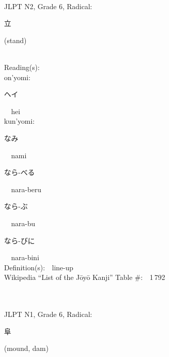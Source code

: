 \begin{multicols}{2}
{\fontsize{34pt}{40pt}  }\ \ \\  %
{JLPT N2, Grade 6, Radical:\ \ {\begin{CJK}{UTF8}{min} 立 \end{CJK}} (stand) } \\
Reading(s):\ \ \\
{\hspace*{1em}}on'yomi:\ \ \\
{\hspace*{2em}}{\begin{CJK}{UTF8}{min} ヘイ \end{CJK}}\ \ hei\ \ \\
{\hspace*{1em}}kun'yomi:\ \ \\
{\hspace*{2em}}{\begin{CJK}{UTF8}{min} なみ \end{CJK}}\ \ nami\ \ \\
{\hspace*{2em}}{\begin{CJK}{UTF8}{min} なら-べる \end{CJK}}\ \ nara-beru\ \ \\
{\hspace*{2em}}{\begin{CJK}{UTF8}{min} なら-ぶ \end{CJK}}\ \ nara-bu\ \ \\
{\hspace*{2em}}{\begin{CJK}{UTF8}{min} なら-びに \end{CJK}}\ \ nara-bini\ \ \\
Definition(s):\ \ line-up \\
Wikipedia ``List of the J\=oy\=o Kanji'' Table \#:\ \ 1\,792 \\
\ \ \\
{\fontsize{34pt}{40pt}  }\ \ \\  %
{JLPT N1, Grade 6, Radical:\ \ {\begin{CJK}{UTF8}{min} 阜 \end{CJK}} (mound, dam) } \\

\end{multicols}
